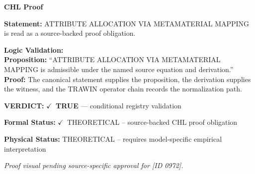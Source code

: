 \vspace{0.45em}
\noindent\textbf{CHL Proof}\par
\textbf{Statement:} ATTRIBUTE ALLOCATION VIA METAMATERIAL MAPPING is read as a source-backed proof obligation.

\textbf{Logic Validation:}\\
\textbf{Proposition:} ``ATTRIBUTE ALLOCATION VIA METAMATERIAL MAPPING is admissible under the named source equation and derivation.''\\
\textbf{Proof:} The canonical statement supplies the proposition, the derivation supplies the witness, and the TRAWIN operator chain records the normalization path.

\textbf{VERDICT:} \ensuremath{\checkmark}\ \textbf{TRUE} --- conditional registry validation

\textbf{Formal Status:} \ensuremath{\checkmark}\ THEORETICAL -- source-backed CHL proof obligation

\textbf{Physical Status:} THEORETICAL -- requires model-specific empirical interpretation
\par\vspace{0.45em}
\par
\vfill
\begingroup\footnotesize\itshape
Proof visual pending source-specific approval for [ID 0972].
\par\endgroup
\vfill
\endgroup
\endgroup
